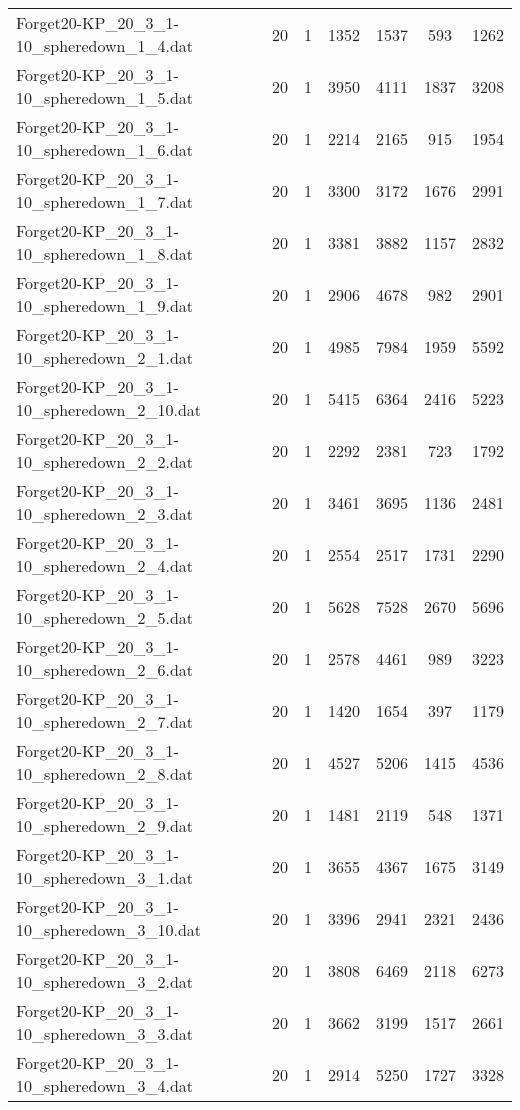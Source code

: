 \begin{table}[!ht]
\begin{tabular}{lcccccc}
Forget20-KP\_20\_3\_1-10\_spheredown\_1\_4.dat & 20 & 1 & 1352 & 1537 & 593 & 1262 \\
Forget20-KP\_20\_3\_1-10\_spheredown\_1\_5.dat & 20 & 1 & 3950 & 4111 & 1837 & 3208 \\
Forget20-KP\_20\_3\_1-10\_spheredown\_1\_6.dat & 20 & 1 & 2214 & 2165 & 915 & 1954 \\
Forget20-KP\_20\_3\_1-10\_spheredown\_1\_7.dat & 20 & 1 & 3300 & 3172 & 1676 & 2991 \\
Forget20-KP\_20\_3\_1-10\_spheredown\_1\_8.dat & 20 & 1 & 3381 & 3882 & 1157 & 2832 \\
Forget20-KP\_20\_3\_1-10\_spheredown\_1\_9.dat & 20 & 1 & 2906 & 4678 & 982 & 2901 \\
Forget20-KP\_20\_3\_1-10\_spheredown\_2\_1.dat & 20 & 1 & 4985 & 7984 & 1959 & 5592 \\
Forget20-KP\_20\_3\_1-10\_spheredown\_2\_10.dat & 20 & 1 & 5415 & 6364 & 2416 & 5223 \\
Forget20-KP\_20\_3\_1-10\_spheredown\_2\_2.dat & 20 & 1 & 2292 & 2381 & 723 & 1792 \\
Forget20-KP\_20\_3\_1-10\_spheredown\_2\_3.dat & 20 & 1 & 3461 & 3695 & 1136 & 2481 \\
Forget20-KP\_20\_3\_1-10\_spheredown\_2\_4.dat & 20 & 1 & 2554 & 2517 & 1731 & 2290 \\
Forget20-KP\_20\_3\_1-10\_spheredown\_2\_5.dat & 20 & 1 & 5628 & 7528 & 2670 & 5696 \\
Forget20-KP\_20\_3\_1-10\_spheredown\_2\_6.dat & 20 & 1 & 2578 & 4461 & 989 & 3223 \\
Forget20-KP\_20\_3\_1-10\_spheredown\_2\_7.dat & 20 & 1 & 1420 & 1654 & 397 & 1179 \\
Forget20-KP\_20\_3\_1-10\_spheredown\_2\_8.dat & 20 & 1 & 4527 & 5206 & 1415 & 4536 \\
Forget20-KP\_20\_3\_1-10\_spheredown\_2\_9.dat & 20 & 1 & 1481 & 2119 & 548 & 1371 \\
Forget20-KP\_20\_3\_1-10\_spheredown\_3\_1.dat & 20 & 1 & 3655 & 4367 & 1675 & 3149 \\
Forget20-KP\_20\_3\_1-10\_spheredown\_3\_10.dat & 20 & 1 & 3396 & 2941 & 2321 & 2436 \\
Forget20-KP\_20\_3\_1-10\_spheredown\_3\_2.dat & 20 & 1 & 3808 & 6469 & 2118 & 6273 \\
Forget20-KP\_20\_3\_1-10\_spheredown\_3\_3.dat & 20 & 1 & 3662 & 3199 & 1517 & 2661 \\
Forget20-KP\_20\_3\_1-10\_spheredown\_3\_4.dat & 20 & 1 & 2914 & 5250 & 1727 & 3328 \\

\end{tabular}
\end{table}
